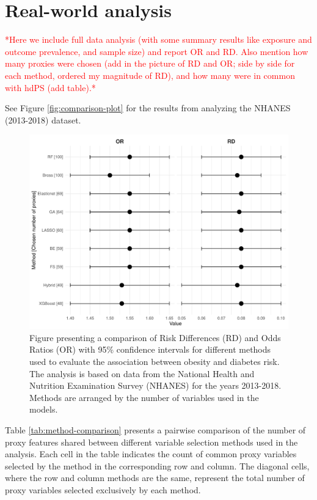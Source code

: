 \documentclass[sn-vancouver,Numbered,lineno,pdflatex]{sn-jnl}
\begin{document}
\section{Real-world analysis}\label{real-world-analysis}

\textcolor{red}{*Here we include full data analysis (with some summary results like exposure and outcome prevalence, and sample size) and report OR and RD. Also mention how many proxies were chosen (add in the picture of RD and OR; side by side for each method, ordered my magnitude of RD), and how many were in common with hdPS (add table).*}

See Figure \ref{fig:comparison-plot} for the results from analyzing the
NHANES (2013-2018) dataset.

\begin{figure}[th]

{\centering \includegraphics[width=1\linewidth,]{manuscript_files/figure-latex/unnamed-chunk-3-1} 

}

\caption{Figure presenting a comparison of Risk Differences (RD) and Odds Ratios (OR) with 95\% confidence intervals for different methods used to evaluate the association between obesity and diabetes risk. The analysis is based on data from the National Health and Nutrition Examination Survey (NHANES) for the years 2013-2018. Methods are arranged by the number of variables used in the models.\label{fig:comparison-plot}}\label{fig:unnamed-chunk-3}
\end{figure}

Table \ref{tab:method-comparison} presents a pairwise comparison of the
number of proxy features shared between different variable selection
methods used in the analysis. Each cell in the table indicates the count
of common proxy variables selected by the method in the corresponding
row and column. The diagonal cells, where the row and column methods are
the same, represent the total number of proxy variables selected
exclusively by each method.
\end{document}
